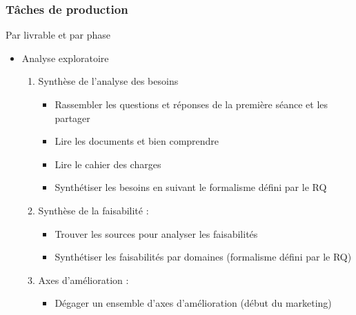 \subsubsection {Tâches de production} 
    Par livrable et par phase 
    \begin{itemize}
		\item Analyse exploratoire     
		\begin{enumerate}
			\item Synthèse de l'analyse des besoins 
			\begin{itemize}
				\item Rassembler les questions et réponses de la première séance et les partager
				\item Lire les documents et bien comprendre
				\item Lire le cahier des charges 
				\item Synthétiser les besoins en suivant le formalisme défini par le RQ
			\end{itemize}
			\item Synthèse de la faisabilité :
			\begin{itemize}
				\item Trouver les sources pour analyser les faisabilités
				\item Synthétiser les faisabilités par domaines (formalisme défini par le RQ)			
			\end{itemize}
			\item Axes d'amélioration :
			\begin{itemize}
				\item Dégager un ensemble d'axes d'amélioration (début du marketing)
			\end{itemize}
		\end{enumerate}
		

\end{itemize}
